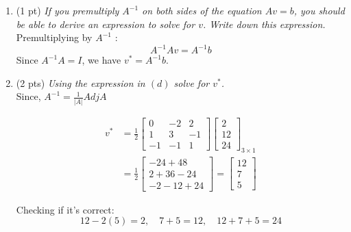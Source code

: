 \documentclass{./../../latex/tests}
\begin{document}
\begin{enumerate}
\begin{enumerate}
  \item (1 pt) \textit{If you premultiply $A^{-1}$ on both sides of the equation $ Av=b $, you should be able to derive an expression to solve for $v$. Write down this expression. } \\

  Premultiplying by $A^{-1}$ :
\[
A^{-1} A v=A^{-1} b 
\]
Since $A^{-1} A=I$, we have  $v^*=A^{-1} b$. \\


  
  \item (2 pts) \textit{Using the expression in $(d)$ solve for $v^*$. } \\

Since, $A^{-1}=\frac{1}{|A|} A d j A$

\[
\begin{aligned}
v^{*} &=\frac{1}{2}\left[\begin{array}{rrr}
0 & -2 & 2 \\
1 & 3 & -1 \\
-1 & -1 & 1
\end{array}\right]\left[\begin{array}{c}
2 \\
12 \\
24
\end{array}\right]_{3 \times 1} \\
&=\frac{1}{2}\left[\begin{array}{c}
-24+48 \\
2+36-24 \\
-2-12+24
\end{array}\right]=\left[\begin{array}{c}
12 \\
7 \\
5
\end{array}\right]
\end{aligned}
\]

Checking if it's correct:
\[
12-2(5)=2, \quad  7+5=12, \quad 12+7+5=24
\]
\end{enumerate}

\end{enumerate}
\end{document}
